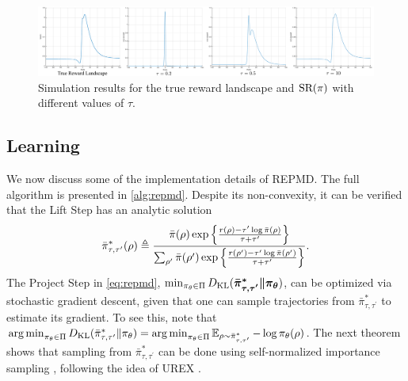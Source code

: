 \begin{figure}[t]
\begin{center}
\includegraphics[width=1.0\linewidth]{./sr_simulation.pdf}
\end{center}
\caption{
Simulation results for the true reward landscape and $\text{SR}(\pi)$
with different values of $\tau$.} 
\label{fig:srsimulation}
\end{figure}



 
\subsection{Learning }
\label{subsec:learning}


We now discuss some of the implementation details of REPMD.
The full algorithm is presented in \cref{alg:repmd}.
Despite its non-convexity, it can be verified that the Lift Step
has an analytic solution
%
\begin{equation}
\label{eq:pitautauprime}
\bar{\pi}_{\tau,\tau^{\prime}}^*(\rho) \triangleq \frac{\bar{\pi}(\rho) \exp\left\{ \frac{r(\rho)-\tau^{\prime} \log \bar{\pi}(\rho) }{ \tau+\tau^{\prime}} \right\}}{ \sum_{\rho^{\prime}}{\bar{\pi}(\rho^{\prime}) \exp\left\{ \frac{r(\rho^{\prime})-\tau^{\prime} \log \bar{\pi}(\rho^{\prime})}{ \tau+\tau^{\prime}} \right\} } }.
\end{equation}
%
The Project Step in \cref{eq:repmd}, $\min\nolimits_{\pi_\theta \in \Pi}{D_{\mathrm{KL}}(\bm{ \bar{\pi}_{\tau,\tau^{\prime}}^* \| \pi_\theta }) }$, can be optimized via stochastic gradient descent, given that one can sample trajectories from $\bar{\pi}_{\tau,\tau^{\prime}}^*$ to estimate its gradient. To see this, note that $\operatorname*{arg\,min}\nolimits_{\pi_\theta \in \Pi}D_{\mathrm{KL}}(\bar{\pi}_{\tau,\tau^{\prime}}^* \| \pi_\theta) = \operatorname*{arg\,min}\nolimits_{\pi_\theta \in \Pi} \operatorname*{\mathbb{E}}_{\rho \sim \bar{\pi}_{\tau,\tau^{\prime}}^* }  - \log \pi_\theta(\rho)$. The next theorem shows that sampling from $\bar{\pi}_{\tau,\tau^{\prime}}^*$ can be done using self-normalized importance sampling \citep{owen2013monte}, following the idea of UREX \citep{nachum2017improving}.

